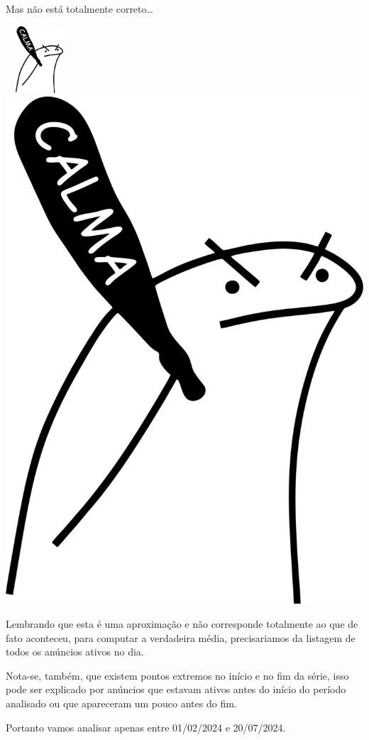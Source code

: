 \documentclass[
]{article}
\let\oldincludegraphics\includegraphics
\renewcommand{\includegraphics}[2][]{ \ifthenelse{ \equal{#1}{} } { \oldincludegraphics[width=2.5cm,height=2.5cm,keepaspectratio=true]{#2} } { \oldincludegraphics[#1]{#2} } }
\begin{document}
Mas não está totalmente correto\ldots{}

\includegraphics{./images/exercer-a-calma.jpg}

Lembrando que esta é uma aproximação e não corresponde totalmente ao que
de fato aconteceu, para computar a verdadeira média, precisariamos da
listagem de todos os anúncios ativos no dia.

Nota-se, também, que existem pontos extremos no início e no fim da
série, isso pode ser explicado por anúncios que estavam ativos antes do
início do período analisado ou que apareceram um pouco antes do fim.

Portanto vamos analisar apenas entre 01/02/2024 e 20/07/2024.
\end{document}
